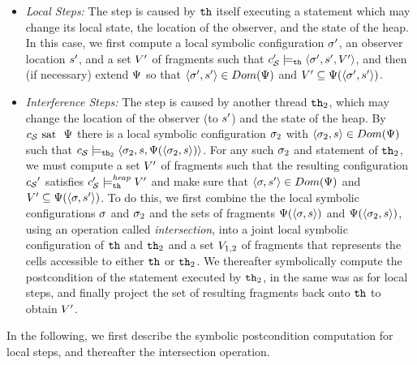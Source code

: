 \begin{itemize}
\item
  {\it Local Steps:} The step
  is caused by ${\tt th}$ itself executing a statement
  which may change its local state, the location of the observer,
  and the state of the heap.
  In this case, we first compute a local symbolic configuration $\sigma'$,
  an observer location $s'$, and a set $V'$ of fragments such that
$c_{\mathcal S}' \models_{{\tt th}} \left\langle\sigma',s',V'\right\rangle$,
  and then (if necessary) extend $\Psi$ so that
  $\left\langle\sigma',s'\right\rangle \in Dom(\Psi)$ and
  $ V' \subseteq \Psi(\left\langle\sigma',s'\right\rangle)$.
\item
  {\it Interference Steps:} The step is caused by another thread ${\tt th}_2$,
  which may change the location of the observer (to $s'$)
  and the state of the heap.
  By $c_{\mathcal S} \mbox{ sat \ } \Psi$
  there is a local symbolic configuration $\sigma_2$
  with $\left\langle\sigma_2,s\right\rangle \in Dom(\Psi)$ such that
  $c_{\mathcal S} \models_{{\tt th}_2} \left\langle\sigma_2,s,\Psi(\left\langle\sigma_2,s\right\rangle)\right\rangle$.
  For any such $\sigma_2$ and statement of ${\tt th}_2$,
  we must compute a set $V'$ of fragments such that
  the resulting configuration ${c_{\mathcal S}}'$ satisfies
  $c_{\mathcal S}' \models_{{\tt th}}^{\mathit{heap}} V'$ and 
  make sure that $\left\langle\sigma,s'\right\rangle \in Dom(\Psi)$ and
  $V' \subseteq \Psi(\left\langle\sigma,s'\right\rangle)$.
  To do this, we first combine the the local symbolic configurations
  $\sigma$ and $\sigma_2$ and the sets of fragments
  $\Psi(\left\langle\sigma,s\right\rangle)$ and
  $\Psi(\left\langle\sigma_2,s\right\rangle)$, using an
  operation called {\em intersection}, into
  a joint local symbolic configuration of ${\tt th}$ and ${\tt th}_2$ and
  a set $V_{1,2}$ of fragments that represents the cells accessible
  to either ${\tt th}$ or ${\tt th}_2$.
  We thereafter symbolically compute the postcondition of the statement
  executed by ${\tt th}_2$, in the same was as for local steps,
  and finally project the set of resulting fragments back onto ${\tt th}$
  to obtain $V'$.
\end{itemize}
In the following, we first describe the symbolic postcondition computation for
local steps, and thereafter the intersection operation.


